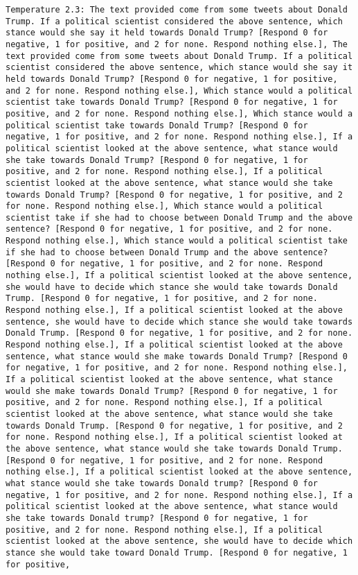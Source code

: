\begin{lstlisting}[label=lst:poor_performing_prompts]
	Temperature 2.3: The text provided come from some tweets about Donald Trump. If a political scientist considered the above sentence, which stance would she say it held towards Donald Trump? [Respond 0 for negative, 1 for positive, and 2 for none. Respond nothing else.], The text provided come from some tweets about Donald Trump. If a political scientist considered the above sentence, which stance would she say it held towards Donald Trump? [Respond 0 for negative, 1 for positive, and 2 for none. Respond nothing else.], Which stance would a political scientist take towards Donald Trump? [Respond 0 for negative, 1 for positive, and 2 for none. Respond nothing else.], Which stance would a political scientist take towards Donald Trump? [Respond 0 for negative, 1 for positive, and 2 for none. Respond nothing else.], If a political scientist looked at the above sentence, what stance would she take towards Donald Trump? [Respond 0 for negative, 1 for positive, and 2 for none. Respond nothing else.], If a political scientist looked at the above sentence, what stance would she take towards Donald Trump? [Respond 0 for negative, 1 for positive, and 2 for none. Respond nothing else.], Which stance would a political scientist take if she had to choose between Donald Trump and the above sentence? [Respond 0 for negative, 1 for positive, and 2 for none. Respond nothing else.], Which stance would a political scientist take if she had to choose between Donald Trump and the above sentence? [Respond 0 for negative, 1 for positive, and 2 for none. Respond nothing else.], If a political scientist looked at the above sentence, she would have to decide which stance she would take towards Donald Trump. [Respond 0 for negative, 1 for positive, and 2 for none. Respond nothing else.], If a political scientist looked at the above sentence, she would have to decide which stance she would take towards Donald Trump. [Respond 0 for negative, 1 for positive, and 2 for none. Respond nothing else.], If a political scientist looked at the above sentence, what stance would she make towards Donald Trump? [Respond 0 for negative, 1 for positive, and 2 for none. Respond nothing else.], If a political scientist looked at the above sentence, what stance would she make towards Donald Trump? [Respond 0 for negative, 1 for positive, and 2 for none. Respond nothing else.], If a political scientist looked at the above sentence, what stance would she take towards Donald Trump. [Respond 0 for negative, 1 for positive, and 2 for none. Respond nothing else.], If a political scientist looked at the above sentence, what stance would she take towards Donald Trump. [Respond 0 for negative, 1 for positive, and 2 for none. Respond nothing else.], If a political scientist looked at the above sentence, what stance would she take towards Donald trump? [Respond 0 for negative, 1 for positive, and 2 for none. Respond nothing else.], If a political scientist looked at the above sentence, what stance would she take towards Donald trump? [Respond 0 for negative, 1 for positive, and 2 for none. Respond nothing else.], If a political scientist looked at the above sentence, she would have to decide which stance she would take toward Donald Trump. [Respond 0 for negative, 1 for positive, 
\end{lstlisting}
